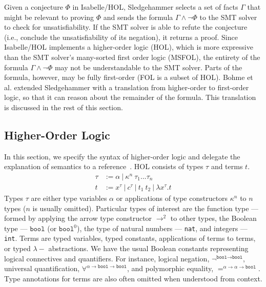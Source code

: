 \documentclass{article}
\begin{document}
	Given a conjecture $\Phi$ in 
	Isabelle/HOL, Sledgehammer 
	selects a set of facts 
	$\Gamma$ that might be relevant 
	to proving $\Phi$ and sends
	the formula $\Gamma \land \neg 
	\Phi$ to the SMT solver to check 
	for unsatisfiability. If the SMT 
	solver is able to refute the 
	conjecture (i.e., conclude 
	the unsatisfiability of its 
	negation), it returns 
	a proof. Since Isabelle/HOL 
	implements a higher-order logic 
	(HOL), which 
	is more expressive than 
	the SMT solver's many-sorted
	first order logic (MSFOL),
	the entirety of the formula
	$\Gamma \land \neg \Phi$ may not 
	be understandable to the SMT 
	solver. Parts of the formula,
	however, may be fully 
	first-order (FOL is 
	a subset of HOL). Bohme et al.
	extended Sledgehammer with 
	a translation from higher-order 
	to first-order logic, so that 
	it can reason about the remainder
	of the formula. This translation
	is discussed in the rest of this 
	section.
	
	\subsection{Higher-Order Logic}
	\label{sec:hol}
	In this section, we specify the 
	syntax of higher-order logic 
	and delegate the explanation of 
	semantics to a 
	reference~\cite{10.5555/155278}. 
	HOL consists of 
	types $\tau$ and terms $t$. 
	\begin{align*}
	\tau &:= \alpha\ |\ \kappa^n\ 
	\tau_1 ... \tau_n\\
	t &:= x^{\tau}\ |\ c^{\tau}\ |\ t_1\ t_2\ 
	|\ \lambda x^{\tau}.t
	\end{align*}	
	Types $\tau$ are either type
	variables $\alpha$ or 
	applications of type 
	constructors $\kappa^n$ to 
	$n$ types ($n$ is usually omitted). 
	Particular types of interest are 
	the function type --- formed by 
	applying the arrow type constructor 
	$\to^{2}$ to other types, the 
	Boolean type --- $\texttt{bool}$ 
	(or $\texttt{bool}^0$), the type of 
	natural numbers --- \texttt{nat},
	and integers --- \texttt{int}.
	Terms are typed variables, 
	typed constants, applications 
	of terms to terms, or typed
	$\lambda-$ abstractions. We have
	the usual Boolean constants 
	representing logical connectives
	and quantifiers. For instance, 
	logical negation, 
	$\neg^{\texttt{bool} \to 
		\texttt{bool}}$, universal 
	quantification,
	$\forall^{\alpha \to 
		\texttt{bool} \to \texttt{bool}}$, 
	and polymorphic equality,
	$=^{\alpha \to \alpha 
		\to \texttt{bool}}$. Type 
	annotations for terms are also 
	often omitted when understood
	from context.
	
\end{document}
